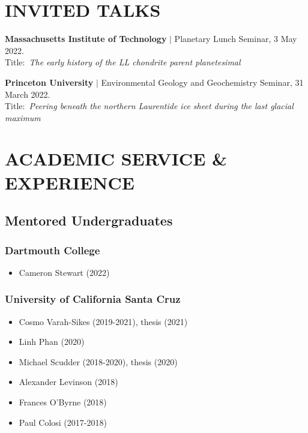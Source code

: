 \documentclass[10pt]{article}
\begin{document}

\section*{INVITED TALKS}

\begin{etaremune} [itemsep=4pt, leftmargin=3ex]

   \item \textbf{Massachusetts Institute of Technology} $|$
   Planetary Lunch Seminar, 3 May 2022. \\
  Title:~\textit{The early history of the LL chondrite parent planetesimal}

  \item \textbf{Princeton University} $|$ 
  Environmental Geology and Geochemistry Seminar, 31 March 2022. \\
  Title:~\textit{Peering beneath the northern Laurentide ice sheet during the last glacial maximum}
  
\end{etaremune}
\vspace{-12pt}

\section*{ACADEMIC SERVICE \& EXPERIENCE}

\subsection*{\textbf{Mentored Undergraduates}}
\subsubsection*{Dartmouth College}
\begin{itemize}
	\item Cameron Stewart (2022)
\end{itemize}

\subsubsection*{University of California Santa Cruz}
\begin{itemize}
	\item Cosmo Varah-Sikes (2019-2021), thesis (2021)
	\item Linh Phan (2020)
	\item Michael Scudder (2018-2020), thesis (2020)
	\item Alexander Levinson (2018)
	\item Frances O'Byrne (2018)
	\item Paul Colosi (2017-2018)
\end{itemize}
\end{document}
